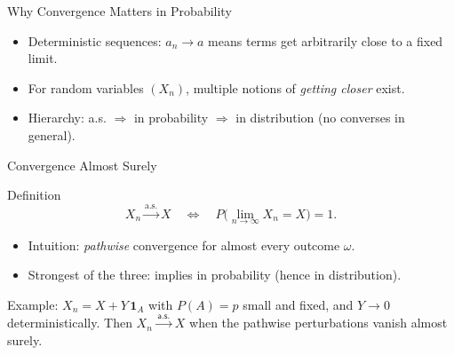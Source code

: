 \documentclass[aspectratio=43]{beamer}
\def\P{P}%
\def\mathbb#1{#1}%
\renewcommand{\P}{\mathbb{P}}
\newcommand{\1}{\mathbf{1}}
\newcommand{\toas}{\xrightarrow{\,\mathsf{a.s.}\,}}
\begin{document}
\begin{frame}{Why Convergence Matters in Probability}
  \begin{itemize}
    \item Deterministic sequences: $a_n\to a$ means terms get arbitrarily close to a fixed limit.
    \item For random variables $(X_n)$, multiple notions of \emph{getting closer} exist.
    \item Hierarchy: \alert{a.s. $\Rightarrow$ in probability $\Rightarrow$ in distribution} (no converses in general).
  \end{itemize}
  \medskip
  {\centering
  }
\end{frame}

\begin{frame}{Convergence Almost Surely}
  \begin{block}{Definition}
    \[ X_n \xrightarrow{\text{a.s.}} X \quad \iff \quad \mathbb{P}\big(\lim_{n\to\infty} X_n = X\big) = 1. \]
  \end{block}
  \begin{itemize}
    \item Intuition: \emph{pathwise} convergence for almost every outcome $\omega$.
    \item Strongest of the three: implies in probability (hence in distribution).
  \end{itemize}
  {\centering
  }
  \medskip
  {\footnotesize Example: $X_n = X + Y\,\mathbf 1_{A}$ with $\P(A)=p$ small and fixed, and $Y\to 0$ deterministically. Then $X_n\toas X$ when the pathwise perturbations vanish almost surely.}
\end{frame}
\end{document}
